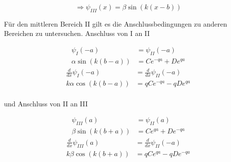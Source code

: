 \begin{equation}
  \label{eq:7}
  \Rightarrow \psi_{III}(x)=\beta\sin(k(x-b))
\end{equation}

Für den mittleren Bereich II gilt es die Anschlussbedingungen zu anderen Bereichen zu untersuchen. Anschluss von I an II


\begin{align}
  \label{eq:8}
  \psi_{I}(-a) &= \psi_{II}(-a) \\
  \alpha\sin(k(b-a)) &= Ce^{-qa}+De^{qa}
\end{align}
\begin{align}
  \label{eq:9}
  \frac{d}{dx}\psi_{I}(-a) &=\frac{d}{dx}\psi_{II}(-a) \\
  k\alpha\cos(k(b-a)) &= qCe^{-qa}-qDe^{qa}
\end{align}
\\
und Anschluss von II an III

\begin{align}
  \label{eq:10}
  \psi_{III}(a) &= \psi_{II}(a) \\
  \beta\sin(k(b+a)) &= Ce^{qa}+De^{-qa}
\end{align}
\begin{align}
  \label{eq:11}
  \frac{d}{dx}\psi_{III}(a) &=\frac{d}{dx}\psi_{II}(-a) \\
  k\beta\cos(k(b+a)) &= qCe^{qa}-qDe^{-qa}
\end{align}





